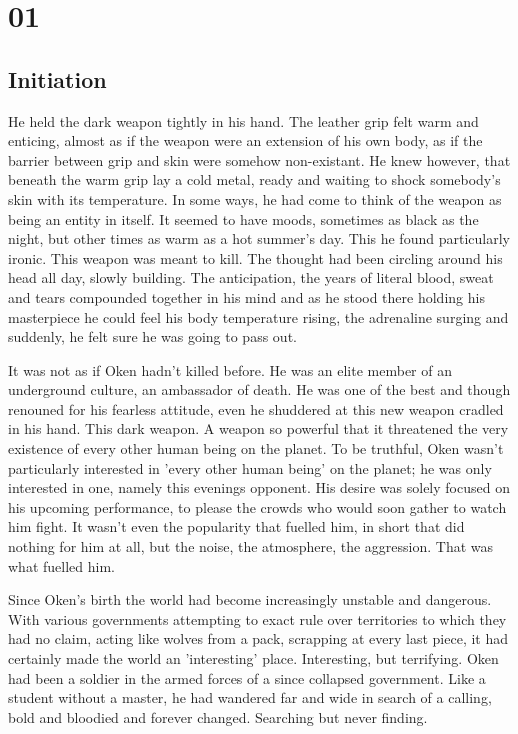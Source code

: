 \chapter{01}
\section{Initiation}


He held the dark weapon tightly in his hand. The leather grip felt warm and enticing, almost as if the weapon were an extension of his own body, as if the barrier between grip and skin were somehow non-existant. He knew however, that beneath the warm grip lay a cold metal, ready and waiting to shock somebody's skin with its temperature. In some ways, he had come to think of the weapon as being an entity in itself. It seemed to have moods, sometimes as black as the night, but other times as warm as a hot summer's day. This he found particularly ironic. This weapon was meant to kill. The thought had been circling around his head all day, slowly building. The anticipation, the years of literal blood, sweat and tears compounded together in his mind and as he stood there holding his masterpiece he could feel his body temperature rising, the adrenaline surging and suddenly, he felt sure he was going to pass out.

It was not as if Oken hadn't killed before. He was an elite member of an underground culture, an ambassador of death. He was one of the best and though renouned for his fearless attitude, even he shuddered at this new weapon cradled in his hand. This dark weapon. A weapon so powerful that it threatened the very existence of every other human being on the planet. To be truthful, Oken wasn't particularly interested in 'every other human being' on the planet; he was only interested in one, namely this evenings opponent. His desire was solely focused on his upcoming performance, to please the crowds who would soon gather to watch him fight. It wasn't even the popularity that fuelled him, in short that did nothing for him at all, but the noise, the atmosphere, the aggression. That was what fuelled him.

Since Oken's birth the world had become increasingly unstable and dangerous. With various governments attempting to exact rule over territories to which they had no claim, acting like wolves from a pack, scrapping at every last piece, it had certainly made the world an 'interesting' place. Interesting, but terrifying. Oken had been a soldier in the armed forces of a since collapsed government. Like a student without a master, he had wandered far and wide in search of a calling, bold and bloodied and forever changed. Searching but never finding.

